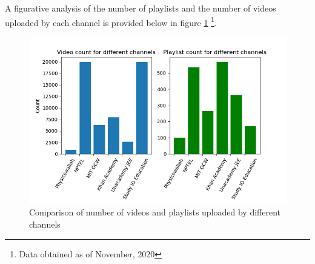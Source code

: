 \documentclass{article}
\begin{document}
A figurative analysis of the number of playlists and the number of videos uploaded by each channel is provided below in figure \ref{fig:channel_info} \footnote{Data obtained as of November, 2020}.
\begin{figure}[!htp]
    \centering
    \includegraphics[scale = 0.50]{images/videos_playlist_count.png}
    \caption{Comparison of number of videos and playlists uploaded by different channels}
    \label{fig:channel_info}
\end{figure}
\Floatbarrier

\newpage
\end{document}

